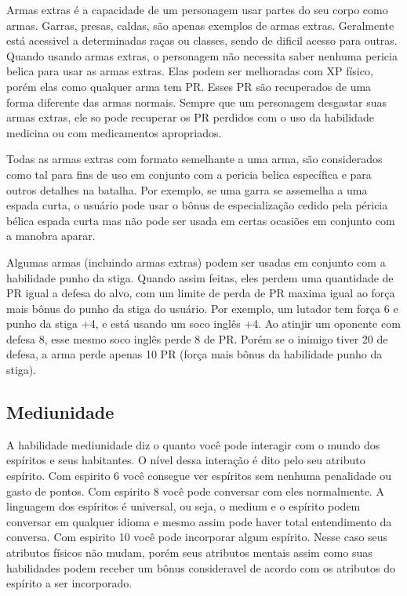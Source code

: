 Armas extras é a capacidade de um personagem usar partes do seu corpo como armas. Garras, presas, caldas, são apenas exemplos de armas extras. Geralmente está acessivel a determinadas raças ou classes, sendo de dificil acesso para outras. Quando usando armas extras, o personagem não necessita saber nenhuma pericia belica para usar as armas extras. Elas podem ser melhoradas com XP físico, porém elas como qualquer arma tem PR. Esses PR são recuperados de uma forma diferente das armas normais. Sempre que um personagem desgastar suas armas extras, ele so pode recuperar os PR perdidos com o uso da habilidade medicina ou com medicamentos apropriados.

Todas as armas extras com formato semelhante a uma arma, são considerados como tal para fins de uso em conjunto com a pericia belica específica e para outros detalhes na batalha. Por exemplo, se uma garra se assemelha a uma espada curta, o usuário pode usar o bônus de especialização cedido pela péricia bélica espada curta mas não pode ser usada em certas ocasiões em conjunto com a manobra aparar.
 
Algumas armas (incluindo armas extras) podem ser usadas em conjunto com a habilidade punho da stiga. Quando assim feitas, eles perdem uma quantidade de PR igual a defesa do alvo, com um limite de perda de PR maxima igual ao força mais bônus do punho da stiga do usuário. Por exemplo, um lutador tem força 6 e punho da stiga +4, e está usando um soco inglês +4. Ao atinjir um oponente com defesa 8, esse mesmo soco inglês perde 8 de PR. Porém se o inimigo tiver 20 de defesa, a arma perde apenas 10 PR (força mais bônus da habilidade punho da stiga).

\subsection{Mediunidade}
 
 A habilidade mediunidade diz o quanto você pode interagir com o mundo dos espíritos e seus habitantes. O nível dessa interação é dito pelo seu atributo espírito. Com espirito 6 você consegue ver espíritos sem nenhuma penalidade ou gasto de pontos. Com espirito 8 você pode conversar com eles normalmente. A linguagem dos espíritos é universal, ou seja, o medium e o espírito podem conversar em qualquer idioma e mesmo assim pode haver total entendimento da conversa. Com espirito 10 você pode incorporar algum espírito. Nesse caso seus atributos físicos não mudam, porém seus atributos mentais assim como suas habilidades podem receber um bônus consideravel de acordo com os atributos do espírito a ser incorporado.
 

